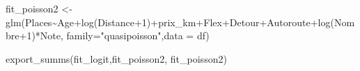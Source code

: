 \documentclass[
]{book}
\newenvironment{Shaded}{\begin{snugshade}}{\end{snugshade}}
\newcommand{\AttributeTok}[1]{\textcolor[rgb]{0.77,0.63,0.00}{#1}}
\newcommand{\DecValTok}[1]{\textcolor[rgb]{0.00,0.00,0.81}{#1}}
\newcommand{\FunctionTok}[1]{\textcolor[rgb]{0.00,0.00,0.00}{#1}}
\newcommand{\NormalTok}[1]{#1}
\newcommand{\OtherTok}[1]{\textcolor[rgb]{0.56,0.35,0.01}{#1}}
\newcommand{\SpecialCharTok}[1]{\textcolor[rgb]{0.00,0.00,0.00}{#1}}
\newcommand{\StringTok}[1]{\textcolor[rgb]{0.31,0.60,0.02}{#1}}
\begin{document}
\begin{Shaded}
\begin{Highlighting}[]
\NormalTok{fit\_poisson2 }\OtherTok{\textless{}{-}} \FunctionTok{glm}\NormalTok{(Places}\SpecialCharTok{\textasciitilde{}}\NormalTok{Age}\SpecialCharTok{+}\FunctionTok{log}\NormalTok{(Distance}\SpecialCharTok{+}\DecValTok{1}\NormalTok{)}\SpecialCharTok{+}\NormalTok{prix\_km}\SpecialCharTok{+}\NormalTok{Flex}\SpecialCharTok{+}\NormalTok{Detour}\SpecialCharTok{+}\NormalTok{Autoroute}\SpecialCharTok{+}\FunctionTok{log}\NormalTok{(Nombre}\SpecialCharTok{+}\DecValTok{1}\NormalTok{)}\SpecialCharTok{*}\NormalTok{Note, }\AttributeTok{family=}\StringTok{"quasipoisson"}\NormalTok{,}\AttributeTok{data =}\NormalTok{ df)}

\FunctionTok{export\_summs}\NormalTok{(fit\_logit,fit\_poisson2, fit\_poisson2)}
\end{Highlighting}
\end{Shaded}

 
  \providecommand{\huxb}[2]{\arrayrulecolor[RGB]{#1}\global\arrayrulewidth=#2pt}
  \providecommand{\huxvb}[2]{\color[RGB]{#1}\vrule width #2pt}
  \providecommand{\huxtpad}[1]{\rule{0pt}{#1}}
  \providecommand{\huxbpad}[1]{\rule[-#1]{0pt}{#1}}
\end{document}
